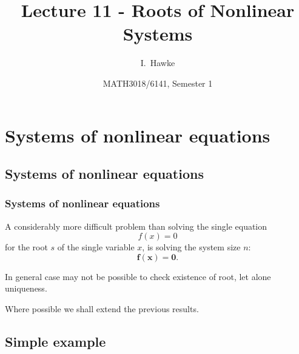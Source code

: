 \documentclass{beamer}
\title[Lecture 11] %
{Lecture 11 - Roots of Nonlinear Systems}
\author[I. Hawke] %
{I.~Hawke}
\institute[University of Southampton] %
{
  School of Mathematics, \\
  University of Southampton, UK
}
\date[Semester 1] %
{MATH3018/6141, Semester 1}
\newcommand{\bfm}[1]{{\boldsymbol{#1}}}
\begin{document}
\begin{frame}
  \titlepage
\end{frame}


\section{Systems of nonlinear equations}

\subsection{Systems of nonlinear equations}

\begin{frame}
  \frametitle{Systems of nonlinear equations}

  A considerably more difficult problem than solving the single equation
  \begin{equation*}
    f(x) = 0
  \end{equation*}
  for the root $s$ of the single variable $x$, is solving the system
  size $n$:
  \begin{equation*}
    \bfm{f}(\bfm{x}) = \bfm{0}.
  \end{equation*} \pause

  \vspace{1ex}

  In general case may not be possible to check existence of root, let alone uniqueness.

  \vspace{1ex}

  Where possible we shall extend the previous results.

\end{frame}

\subsection{Simple example}
\end{document}
